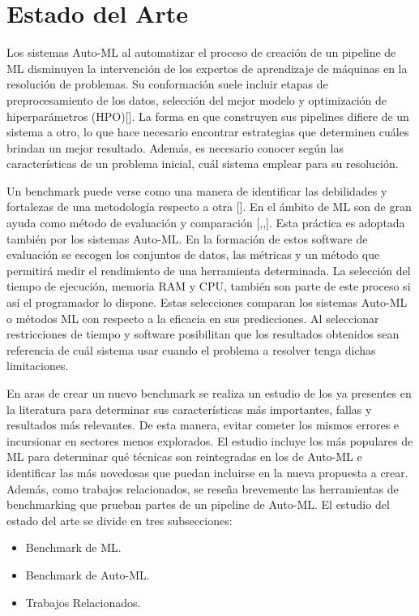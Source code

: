 \chapter{Estado del Arte}\label{chapter:state-of-the-art}

Los sistemas Auto-ML al automatizar el proceso de creación de un pipeline de ML disminuyen la intervención de los expertos de aprendizaje de máquinas en la resolución de 
problemas. Su conformación suele incluir etapas de preprocesamiento de los datos, selección del mejor modelo y optimización de hiperparámetros (HPO)[\cite{36}].
La forma en que construyen sus pipelines difiere de un sistema a otro, lo que hace necesario encontrar estrategias que determinen cuáles brindan un 
mejor resultado. Además, es necesario conocer según las características de un problema inicial, cuál sistema emplear para su resolución. 

Un benchmark puede verse como una manera de identificar las debilidades y fortalezas de una metodología respecto a otra [\cite{2}]. En el ámbito de ML son de 
gran ayuda como método de evaluación y comparación [\cite{5},\cite{6},\cite{46}]. Esta práctica es adoptada también por los sistemas Auto-ML. En la formación de estos 
software de evaluación se escogen los conjuntos de datos, las métricas y un método que permitirá medir el rendimiento de una herramienta determinada. La selección del 
tiempo de ejecución, memoria RAM y CPU, también son parte de este proceso si así el programador lo dispone. Estas selecciones comparan los sistemas Auto-ML o métodos ML 
con respecto a la eficacia en sus predicciones. Al seleccionar restricciones de tiempo y software posibilitan que los resultados obtenidos sean referencia de cuál 
sistema usar cuando el problema a resolver tenga dichas limitaciones.

En aras de crear un nuevo benchmark se realiza un estudio de los ya presentes en la literatura para determinar sus características más importantes, 
fallas y resultados más relevantes. De esta manera, evitar cometer los mismos errores e incursionar en sectores menos explorados. El estudio incluye los más 
populares de ML para determinar qué técnicas son reintegradas en los de Auto-ML e identificar las más novedosas que puedan incluirse en la nueva propuesta a crear. 
Además, como trabajos relacionados, se reseña brevemente las herramientas de benchmarking que prueban partes de un pipeline de Auto-ML. El estudio del estado del arte se divide en tres 
subsecciones:
\begin{itemize}
\item Benchmark de ML. 
\item Benchmark de Auto-ML.
\item Trabajos Relacionados.
\end{itemize}
